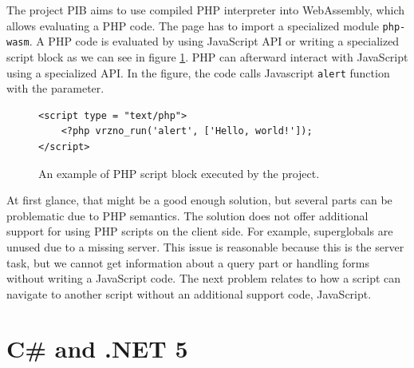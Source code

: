 The project PIB \cite{online:pib} aims to use compiled PHP interpreter into WebAssembly, which allows evaluating a PHP code.
The page has to import a specialized module \texttt{php-wasm}. 
A PHP code is evaluated by using JavaScript API or writing a specialized script block as we can see in figure \ref{img03:vrzno}.
PHP can afterward interact with JavaScript using a specialized API.
In the figure, the code calls Javascript \texttt{alert} function with the parameter.
\par
\begin{figure}
\begin{lstlisting}
<script type = "text/php">
	<?php vrzno_run('alert', ['Hello, world!']);
</script>
\end{lstlisting}
\caption{An example of PHP script block executed by the project.}
\label{img03:vrzno}
\end{figure}
\par
At first glance, that might be a good enough solution, but several parts can be problematic due to PHP semantics.
The solution does not offer additional support for using PHP scripts on the client side.
For example, superglobals are unused due to a missing server.
This issue is reasonable because this is the server task, but we cannot get information about a query part or handling forms without writing a JavaScript code.
The next problem relates to how a script can navigate to another script without an additional support code, JavaScript.

\section{C\# and .NET 5}

